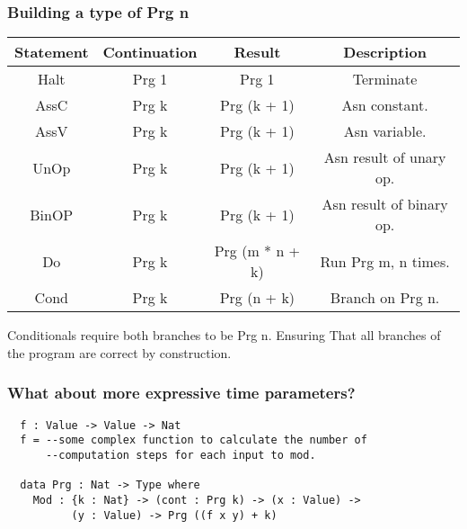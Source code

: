 \documentclass{beamer}
\begin{document}
\begin{frame}[fragile]
  \frametitle{Building a type of Prg n}
  \begin{table}[h!]
  \begin{tabular}{c|c|c|c}
  Statement & Continuation & Result & Description \\
  \hline 
  Halt & Prg 1 & Prg 1 & Terminate \\
  AssC & Prg k & Prg (k + 1) & Asn constant. \\
  AssV & Prg k & Prg (k + 1) & Asn variable. \\
  UnOp & Prg k & Prg (k + 1) & Asn result of unary op. \\
  BinOP & Prg k & Prg (k + 1) & Asn result of binary op. \\
  Do & Prg k & Prg (m * n + k) & Run Prg m, n times. \\
  Cond & Prg k & Prg (n + k) & Branch on Prg n. \\
  \end{tabular} 
  \end{table}
  Conditionals require both branches to be Prg n. Ensuring
  That all branches of the program are correct by construction.
\end{frame}

\begin{frame}[fragile]
  \frametitle{What about more expressive time parameters?}
  \begin{verbatim}
  f : Value -> Value -> Nat
  f = --some complex function to calculate the number of
      --computation steps for each input to mod.
  
  data Prg : Nat -> Type where
    Mod : {k : Nat} -> (cont : Prg k) -> (x : Value) ->
          (y : Value) -> Prg ((f x y) + k)
  \end{verbatim}
\end{frame}
\end{document}
